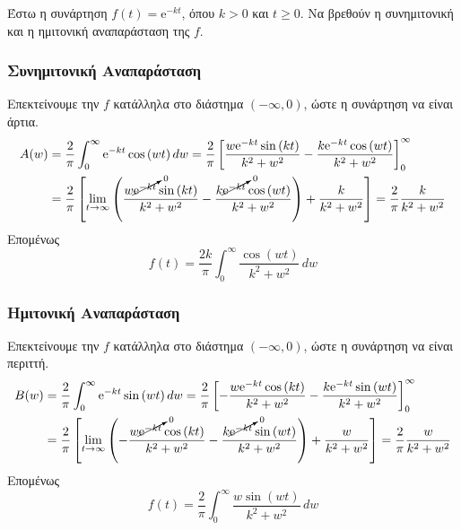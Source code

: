 \begin{example}
  Έστω η συνάρτηση $ f(t) = \mathrm{e}^{-kt} $, όπου $ k>0 $ και $ t \geq 0 $. 
  Να βρεθούν η συνημιτονική και η ημιτονική αναπαράσταση της $f$.
\end{example}
\begin{solution}
\item {}
  \subsubsection*{Συνημιτονική Αναπαράσταση}
  Επεκτείνουμε την $f$ κατάλληλα στο διάστημα $ (- \infty, 0) $, ώστε η συνάρτηση να
  είναι άρτια. 
  \begin{align*}
    A(w) &= \frac{2}{\pi} \int _{0}^{\infty} \mathrm{e}^{-kt} \cos{(wt)} \,{dw} = 
    \frac{2}{\pi} \left[\frac{w \mathrm{e}^{-kt} \sin{(kt)}}{k^{2}+w^{2}} - \frac{k
    \mathrm{e}^{-kt} \cos{(wt)}}{k^{2}+w^{2}}\right]_{0}^{\infty} \\
         &= \frac{2}{\pi} \left[\lim_{t \to \infty} \left(\frac{w
               \cancelto{0}{\mathrm{e}^{-kt}} \sin{(kt)}}{k^{2}+w^{2}} - \frac{k 
             \cancelto{0}{\mathrm{e}^{-kt}} \cos{(wt)}}{k^{2}+w^{2}} 
         \right)+ \frac{k}{k^{2}+w^{2}}\right] = \frac{2}{\pi} \frac{k}{k^{2}+w^{2}}
  \end{align*} 
  Επομένως 
  \[
    \boxed{f(t) = \frac{2k}{\pi} \int _{0}^{\infty} \frac{\cos{(wt)}}{k^{2}+w^{2}} 
    \,{dw}}
  \] 



  \subsubsection*{Ημιτονική Αναπαράσταση}
  Επεκτείνουμε την $f$ κατάλληλα στο διάστημα $ (- \infty, 0) $, ώστε η συνάρτηση να
  είναι περιττή. 
  \begin{align*}
    B(w) &= \frac{2}{\pi} \int _{0}^{\infty} \mathrm{e}^{-kt} \sin{(wt)} \,{dw} = 
    \frac{2}{\pi} \left[-\frac{w \mathrm{e}^{-kt} \cos{(kt)}}{k^{2}+w^{2}} - \frac{k
    \mathrm{e}^{-kt} \sin{(wt)}}{k^{2}+w^{2}}\right]_{0}^{\infty} \\
         &= \frac{2}{\pi} \left[\lim_{t \to \infty} \left(-\frac{w
               \cancelto{0}{\mathrm{e}^{-kt}} \cos{(kt)}}{k^{2}+w^{2}} - \frac{k 
             \cancelto{0}{\mathrm{e}^{-kt}} \sin{(wt)}}{k^{2}+w^{2}} 
         \right)+ \frac{w}{k^{2}+w^{2}}\right] = \frac{2}{\pi} \frac{w}{k^{2}+w^{2}}
  \end{align*} 
  Επομένως 
  \[
    \boxed{f(t) = \frac{2}{\pi} \int _{0}^{\infty} \frac{w\sin{(wt)}}{k^{2}+w^{2}} 
    \,{dw}}
  \] 
\end{solution}

